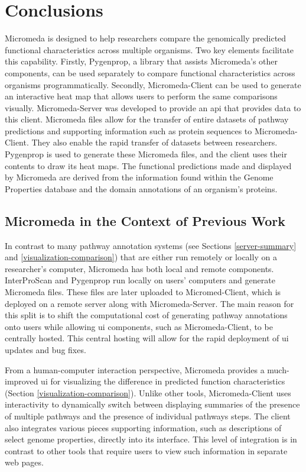 \chapter{Conclusions} \label{conclusion-chapter}

Micromeda is designed to help researchers compare the genomically predicted 
functional characteristics across multiple organisms. Two key elements facilitate 
this capability. Firstly, Pygenprop, a library that assists Micromeda's other 
components, can be used separately to compare functional characteristics across 
organisms programmatically. Secondly, Micromeda-Client can be used to generate 
an interactive heat map that allows users to perform the same comparisons 
visually. Micromeda-Server was developed to provide an \gls{api} that provides 
data to this client. Micromeda files allow for the transfer of entire datasets 
of pathway predictions and supporting information such as protein sequences to 
Micromeda-Client. They also enable the rapid transfer of datasets between 
researchers. Pygenprop is used to generate these Micromeda files, and the client 
uses their contents to draw its heat maps. The functional predictions made and 
displayed by Micromeda are derived from the information found within the Genome 
Properties database and the domain annotations of an organism's proteins. 

\section{Micromeda in the Context of Previous Work}

In contrast to many pathway annotation systems (see Sections 
\ref{server-summary} and \ref{visualization-comparison}) that are either run 
remotely or locally on a researcher's computer, Micromeda has both local and 
remote components. InterProScan and Pygenprop run locally on users' computers 
and generate Micromeda files. These files are later uploaded to Micromed-Client, 
which is deployed on a remote server along with Micromeda-Server. The main 
reason for this split is to shift the computational cost of generating pathway 
annotations onto users while allowing \gls{ui} components, such as 
Micromeda-Client, to be centrally hosted. This central hosting will allow for 
the rapid deployment of \gls{ui} updates and bug fixes.

From a human-computer interaction perspective, Micromeda provides a 
much-improved \gls{ui} for visualizing the difference in predicted function 
characteristics (Section \ref{visualization-comparison}). Unlike other tools, 
Micromeda-Client uses interactivity to dynamically switch between displaying 
summaries of the presence of multiple pathways and the presence of individual 
pathways steps. The client also integrates various pieces supporting information, such 
as descriptions of select genome properties, directly into its interface. This 
level of integration is in contrast to other tools that require users to view 
such information in separate web pages.

